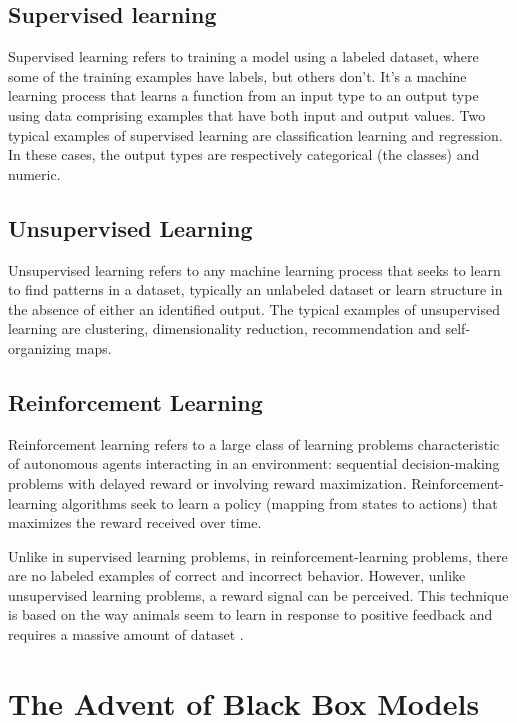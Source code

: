 \subsection*{Supervised learning}

Supervised learning \cite{sammut2011encyclopedia} refers to training a model using a labeled dataset, where some of the training examples have labels, but others don’t. It's a machine learning process that learns a function from an input type to an output type using data comprising examples that have both input and output values. Two typical examples of supervised learning are classification learning and regression. In these cases, the output types are respectively categorical (the classes) and numeric. 

\subsection*{Unsupervised Learning}

Unsupervised learning \cite{sammut2011encyclopedia} refers to any machine learning process that seeks to learn to find patterns in a dataset, typically an unlabeled dataset or learn structure in the absence of either an identified output. The typical examples of unsupervised learning are clustering, dimensionality reduction, recommendation and self-organizing maps.

\subsection*{Reinforcement Learning}

Reinforcement learning \cite{sammut2011encyclopedia} refers to a large class of learning problems characteristic of autonomous agents interacting in an environment: sequential decision-making problems with delayed reward or involving reward maximization. Reinforcement-learning algorithms seek to learn a policy (mapping from states to actions) that maximizes the reward received over time.

Unlike in supervised learning problems, in reinforcement-learning problems, there are no labeled examples of correct and incorrect behavior. However, unlike unsupervised learning problems, a reward signal can be perceived. This technique is based on the way animals seem to learn in response to positive feedback and requires a massive amount of dataset \cite{sammut2011encyclopedia}.

\section{The Advent of Black Box Models}

